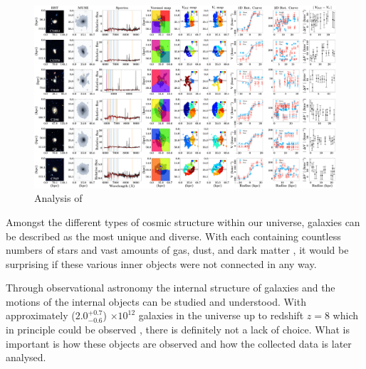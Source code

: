\documentclass[12pt, twocolumn]{revtex4}    %
\begin{document}
\onecolumngrid

\begin{figure}
\centering
\includegraphics[width=1.0\textheight,height=0.6\textwidth]{data/spectra_complete_velocities}
\vspace{1cm}  %
\caption[Tully-Fisher]{Analysis of }
\label{fig:multiple_spectra}
\end{figure}

\twocolumngrid


Amongst the different types of cosmic structure within our universe, galaxies can be described as the most unique and diverse. With each containing countless numbers of stars and vast amounts of gas, dust, and dark matter \citep{carroll_astro}, it would be surprising if these various inner objects were not connected in any way.

Through observational astronomy the internal structure of galaxies and the motions of the internal objects can be studied and understood. With approximately ($2.0^{+0.7}_{-0.6}$) $\times 10^{12}$ galaxies in the universe up to redshift $z=8$ which in principle could be observed \citep{conselice_galaxynumber}, there is definitely not a lack of choice. What is important is how these objects are observed and how the collected data is later analysed. 



\end{document}
